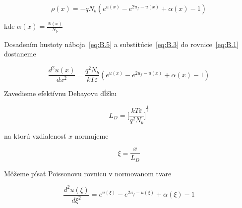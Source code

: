 \begin{equation}\label{eq:B.5}
  \rho(x) = -qN_b(e^{u(x)} - e^{2u_f-u(x)} + \alpha(x) - 1)
\end{equation}

kde $\alpha(x) = \frac{N(x)}{N_b}$

Dosadením hustoty náboja~\ref{eq:B.5} a substitúcie~\ref{eq:B.3} do rovnice~\ref{eq:B.1} dostaneme

\begin{equation}\label{eq:B.6}
  \frac{d^{2}u(x)}{dx^2} = \frac{q^2N_b}{kT\varepsilon}(e^{u(x)} - e^{2u_f-u(x)} + \alpha(x) - 1)
\end{equation}

Zavedieme efektívnu Debayovu dĺžku

\begin{equation}\label{eq:B.7}
  L_D = {\Bigg[\frac{kT\varepsilon}{q^{2}N_b}\Bigg]}^{\frac{1}{2}}
\end{equation}

na ktorú vzdialenosť $x$ normujeme

\begin{equation}\label{eq:B.8}
  \xi = \frac{x}{L_D}
\end{equation}

Môžeme písať Poissonovu rovnicu v normovanom tvare

\begin{equation}\label{eq:B.9}
  \frac{d^{2}u(\xi)}{d\xi^2} = e^{u(\xi)} - e^{2u_f-u(\xi)} + \alpha(\xi) - 1
\end{equation}
